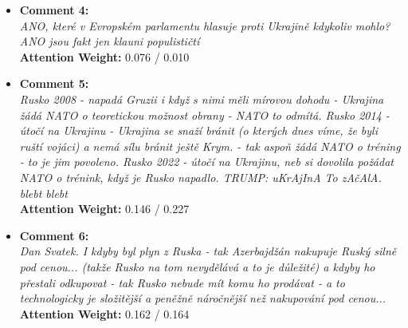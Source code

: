 \documentclass[twoside]{ctuthesis}
\theoremstyle{plain}
\theoremstyle{definition}
\theoremstyle{note}
\begin{document}
\begin{tcolorbox}[colback=white, colframe=black, title=User B - Trolliness Score: 0.014 (Multilingual Model) / 0.013 (Russian Model)]
\begin{itemize}
    \item \textbf{Comment 4:} \\
    \textit{ANO, které v Evropském parlamentu hlasuje proti Ukrajině kdykoliv mohlo? ANO jsou fakt jen klauni populističtí} \\
    \textbf{Attention Weight:} 0.076 / 0.010

    \vspace{0.2cm}

    \item \textbf{Comment 5:} \\
    \textit{Rusko 2008 - napadá Gruzii i když s nimi měli mírovou dohodu - Ukrajina žádá NATO o teoretickou možnost obrany - NATO to odmítá. Rusko 2014 - útočí na Ukrajinu - Ukrajina se snaží bránit (o kterých dnes víme, že byli ruští vojáci) a nemá sílu bránit ještě Krym. - tak aspoň žádá NATO o tréning - to je jim povoleno. Rusko 2022 - útočí na Ukrajinu, neb si dovolila požádat NATO o trénink, když je Rusko napadlo. TRUMP: uKrAjInA To zAčAlA. blebt blebt} \\
    \textbf{Attention Weight:} 0.146 / 0.227

    \vspace{0.2cm}

    \item \textbf{Comment 6:} \\
    \textit{Dan Svatek. I kdyby byl plyn z Ruska - tak Azerbajdžán nakupuje Ruský silně pod cenou... (takže Rusko na tom nevydělává a to je důležité) a kdyby ho přestali odkupovat - tak Rusko nebude mít komu ho prodávat - a to technologicky je složitější a peněžně náročnější než nakupování pod cenou...} \\
    \textbf{Attention Weight:} 0.162 / 0.164
\end{itemize}
\end{tcolorbox}
\end{document}

